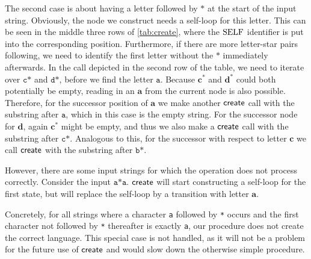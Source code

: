 The second case is about having a letter followed by $\texttt{*}$ at the start of the input string. Obviously, the node we construct needs a self-loop for this letter. This can be seen in the middle three rows of \autoref{tab:create}, where the $\mathrm{SELF}$ identifier is put into the corresponding position. 
Furthermore, if there are more letter-star pairs following, we need to identify the first letter without the $\texttt{*}$ immediately afterwards. In the call depicted in the second row of the table, we need to iterate over $\texttt{c*}$ and $\texttt{d*}$, before we find the letter $\texttt{a}$. Because $\bm{c^{*}}$ and $\bm{d^{*}}$ could both potentially be empty, reading in an $\bm{a}$ from the current node is also possible. Therefore, for the successor position of $\bm{a}$ we make another $\operatorname{\textsf{create}}$ call with the substring after $\texttt{a}$, which in this case is the empty string.
For the successor node for $\bm{d}$, again $\bm{c^{*}}$ might be empty, and thus we also make a 
$\operatorname{\textsf{create}}$ call with the substring after $\texttt{c*}$. Analogous to this, for the successor with respect to letter $\bm{c}$ we call $\operatorname{\textsf{create}}$ with the substring after $\texttt{b*}$. 

However, there are some input strings for which the operation does not process correctly. Consider the input $\texttt{a*a}$. $\operatorname{\textsf{create}}$ will start constructing a self-loop for the first state, but will replace the self-loop by a transition with letter $\bm{a}$. 

Concretely, for all strings where a character \texttt{a} followed by \texttt{*} occurs and the first character not followed by \texttt{*} thereafter is exactly \texttt{a}, our procedure does not create the correct language.
This special case is not handled, as it will not be a problem for the future use of $\operatorname{\textsf{create}}$ and would slow down the otherwise simple procedure. 

%


